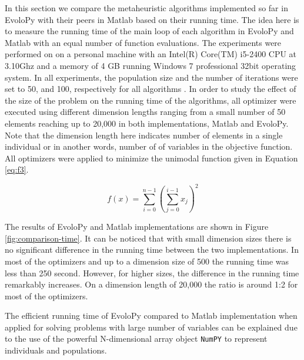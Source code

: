 \documentclass[a4paper,twoside]{article}
\begin{document}
In this section we compare the metaheuristic algorithms implemented so far in EvoloPy with their peers in Matlab based on their running time. The idea here is to measure the running time of the main loop of each algorithm in EvoloPy and Matlab with an equal number of function evaluations. The experiments were performed on on a personal machine with an  Intel(R) Core(TM) i5-2400 CPU at 3.10Ghz and a memory of 4 GB running Windows 7 professional 32bit operating system. In all experiments, the population size and the number of iterations were set to 50, and 100, respectively for all algorithms . In order to study the effect of the size of the problem on the running time of the algorithms, all optimizer were executed using different dimension lengths ranging from a small number of 50 elements reaching up to 20,000 in both implementations, Matlab and EvoloPy. Note that the dimension length here indicates number of elements in a single individual or in another words, number of of variables in the objective function. All optimizers were applied to minimize the unimodal function given in Equation \ref{eq:f3}. 



\begin{equation}
f(x)=\sum_{i=0}^{n-1}(\sum_{j=0}^{i-1}x_{j})^{2}
\label{eq:f3}
\end{equation}

The results of EvoloPy and Matlab implementations are shown in Figure
\ref{fig:comparison-time}. It can be noticed that with small dimension
sizes there is no significant difference in the running time between
the two implementations. In most of the optimizers and up to a
dimension size of 500  the running time was less than 250
second. However, for higher sizes, the difference in the running time
remarkably increases. On a dimension length of 20,000 the ratio is
around 1:2 for most of the optimizers. 

The efficient running time of EvoloPy compared to Matlab
implementation when applied for solving problems with large number of
variables can be explained due to the use of the powerful
N-dimensional array object \texttt{NumPY} to represent individuals and
populations. 
\end{document}
